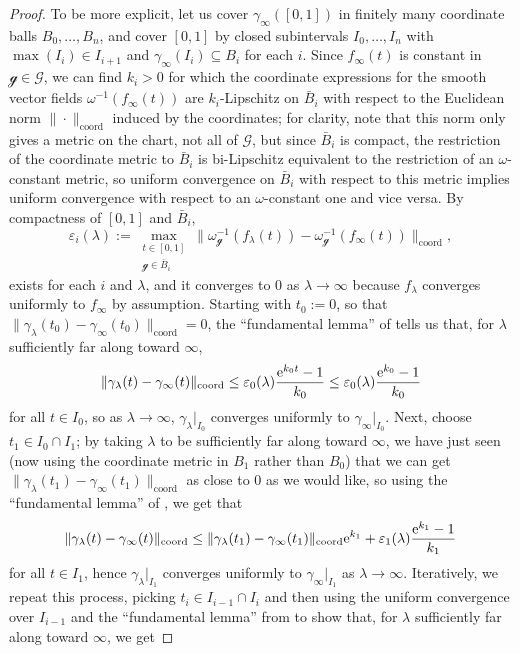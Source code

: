 \documentclass[pdftex]{sigma}
\numberwithin{equation}{section}
\theoremstyle{definition}
\begin{document}
\begin{proof}
To be more explicit, let us cover $\gamma_\infty([0,1])$ in finitely many coordinate balls $B_0,\dots,B_n$, and cover $[0,1]$ by closed subintervals $I_0,\dots,I_n$ with $\max(I_i)\in I_{i+1}$ and $\gamma_\infty(I_i)\subseteq B_i$ for each $i$. Since $f_\infty(t)$ is constant in $\mathscr{g}\in\mathscr{G}$, we can find $k_i>0$ for which the coordinate expressions for the smooth vector fields $\omega^{-1}(f_\infty(t))$ are $k_i$-Lipschitz on $\bar{B}_i$ with respect to the Euclidean norm $\|\cdot\|_\text{coord}$ induced by the coordinates; for clarity, note that this norm only gives a metric on the chart, not all of $\mathscr{G}$, but since $\bar{B}_i$ is compact, the restriction of the coordinate metric to $\bar{B}_i$ is bi-Lipschitz equivalent to the restriction of an $\omega$-constant metric, %
so uniform convergence on $\bar{B}_i$ with respect to this metric implies uniform convergence with respect to an $\omega$-constant one and vice versa. By compactness of $[0,1]$ and $\bar{B}_i$,
\[\varepsilon_i(\lambda):=\max_{\substack{t\in[0,1] \\ \mathscr{g}\in\bar{B}_i}}\bigl\|\omega_\mathscr{g}^{-1}(f_\lambda(t))-\omega_\mathscr{g}^{-1}(f_\infty(t))\bigr\|_\text{coord},\]
exists for each $i$ and $\lambda$, and it converges to $0$ as $\lambda\rightarrow\infty$ because $f_\lambda$ converges uniformly to $f_\infty$ by assumption. Starting with $t_0:=0$, so that $\|\gamma_\lambda(t_0)-\gamma_\infty(t_0)\|_\text{coord}=0$, the ``fundamental lemma'' of \cite{HCartan1971} tells us that, for $\lambda$ sufficiently far along toward $\infty$,
\[\|\gamma_\lambda(t)-\gamma_\infty(t)\|_\text{coord}\leq\varepsilon_0(\lambda)\frac{{\rm e}^{k_0t}-1}{k_0}\leq\varepsilon_0(\lambda)\frac{{\rm e}^{k_0}-1}{k_0}\]
for all $t\in I_0$, so as $\lambda\rightarrow\infty$, $\gamma_\lambda|_{I_0}$ converges uniformly to $\gamma_\infty|_{I_0}$. Next, choose $t_1\in I_0\cap I_1$; by taking $\lambda$ to be sufficiently far along toward $\infty$, we have just seen (now using the coordinate metric in $B_1$ rather than $B_0$) that we can get $\|\gamma_\lambda(t_1)-\gamma_\infty(t_1)\|_\text{coord}$ as close to $0$ as we would like, so using the ``fundamental lemma'' of \cite{HCartan1971}, we get that
\[\|\gamma_\lambda(t)-\gamma_\infty(t)\|_\text{coord}\leq\|\gamma_\lambda(t_1)-\gamma_\infty(t_1)\|_\text{coord}{\rm e}^{k_1}+\varepsilon_1(\lambda)\frac{{\rm e}^{k_1}-1}{k_1}\]
for all $t\in I_1$, hence $\gamma_\lambda|_{I_1}$ converges uniformly to $\gamma_\infty|_{I_1}$ as $\lambda\rightarrow\infty$. Iteratively, we repeat this process, picking $t_i\in I_{i-1}\cap I_i$ and then using the uniform convergence over $I_{i-1}$ and the ``fundamental lemma'' from \cite{HCartan1971} to show that, for $\lambda$ sufficiently far along toward $\infty$, we get

\end{proof}
\end{document}
